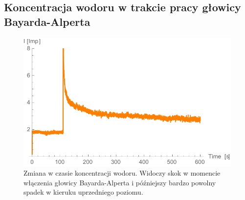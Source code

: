 \documentclass[paper=a4, fontsize=12pt]{scrartcl}
\begin{document}
\subsection{Koncentracja wodoru w trakcie pracy głowicy Bayarda-Alperta}
\begin{figure}[h!]
\centering
\includegraphics[width=0.5\linewidth]{hydtime}
\caption{Zmiana w czasie koncentracji wodoru. Widoczy skok w momencie włączenia głowicy Bayarda-Alperta i późniejszy bardzo powolny spadek w kieruku uprzedniego poziomu.}
\label{fig:hydtime}
\end{figure}
\end{document}
